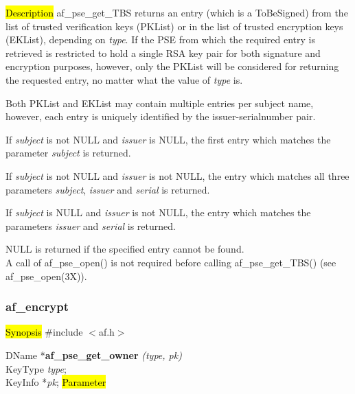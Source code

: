 


\hl{Description}
af\_pse\_get\_TBS returns an entry (which is a ToBeSigned) from the list of trusted 
verification keys (PKList) or in the list of trusted encryption keys (EKList), depending
on {\em type}.
If the PSE from which the required entry is retrieved is restricted to hold a single RSA key pair
for both signature and encryption purposes, however, only the PKList will be considered for returning the requested entry,
no matter what the value of {\em type} is.

Both PKList and EKList may contain multiple entries per subject name, however,
each entry is uniquely identified by the issuer-serialnumber pair.

If {\em subject} is not NULL and {\em issuer} is NULL, the first entry which
matches the parameter {\em subject} is returned.

If {\em subject} is not NULL and {\em issuer} is not NULL, the entry which 
matches all three parameters {\em subject}, {\em issuer} and {\em serial} is returned.
 
If {\em subject} is NULL and {\em issuer} is not NULL, the entry which matches the
parameters {\em issuer} and {\em serial} is returned.

NULL is returned if the specified entry cannot be found.
\\ [1em]
A call of af\_pse\_open() is not required before calling af\_pse\_get\_TBS()
(see af\_pse\_open(3X)).

\subsubsection{af\_encrypt}
\label{af_search_PK}
\hl{Synopsis}
\#include $<$af.h$>$

DName *{\bf af\_pse\_get\_owner} {\em (type, pk)} \\
KeyType {\em type}; \\
KeyInfo *{\em pk};
\hl{Parameter}

